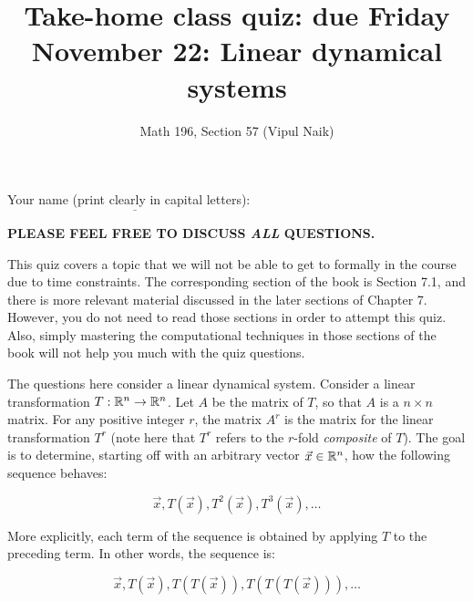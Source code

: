 \documentclass[10pt]{amsart}
\title{Take-home class quiz: due Friday November 22: Linear dynamical systems}
\author{Math 196, Section 57 (Vipul Naik)}
\begin{document}
\maketitle

Your name (print clearly in capital letters): $\underline{\qquad\qquad\qquad\qquad\qquad\qquad\qquad\qquad\qquad\qquad}$

{\bf PLEASE FEEL FREE TO DISCUSS {\em ALL} QUESTIONS.}

This quiz covers a topic that we will not be able to get to formally
in the course due to time constraints. The corresponding section of
the book is Section 7.1, and there is more relevant material discussed
in the later sections of Chapter 7. However, you do not need to read
those sections in order to attempt this quiz. Also, simply mastering
the computational techniques in those sections of the book will not
help you much with the quiz questions.

The questions here consider a linear dynamical system. Consider a
linear transformation $T:\mathbb{R}^n \to \mathbb{R}^n$. Let $A$ be the matrix of $T$,
so that $A$ is a $n \times n$ matrix. For any positive integer $r$,
the matrix $A^r$ is the matrix for the linear transformation $T^r$
(note here that $T^r$ refers to the $r$-fold {\em composite} of
$T$). The goal is to determine, starting off with an arbitrary vector
$\vec{x} \in \mathbb{R}^n$, how the following sequence behaves:

$$\vec{x}, T(\vec{x}), T^2(\vec{x}), T^3(\vec{x}), \dots$$

More explicitly, each term of the sequence is obtained by applying $T$
to the preceding term. In other words, the sequence is:

$$\vec{x}, T(\vec{x}), T(T(\vec{x})), T(T(T(\vec{x}))), \dots$$
\end{document}
